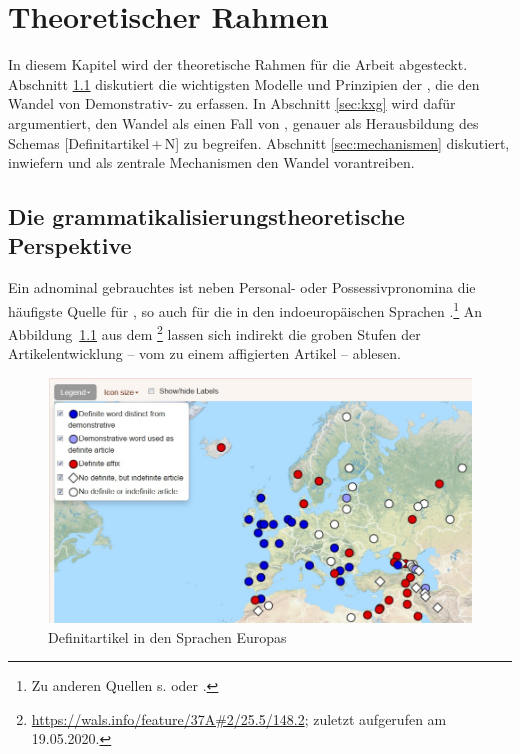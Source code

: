 \chapter{Theoretischer Rahmen} \label{chapter:theorie}

In diesem Kapitel wird der theoretische Rahmen für die Arbeit abgesteckt. 
Abschnitt \ref{sec:gram} diskutiert die wichtigsten Modelle und Prinzipien  der , die den Wandel von Demonstrativ- zu   erfassen. In Abschnitt \ref{sec:kxg} wird dafür argumentiert, den Wandel als einen Fall von , genauer als Herausbildung des Schemas [Definitartikel\,+\,N] zu begreifen. Abschnitt \ref{sec:mechanismen} diskutiert, inwiefern  und  als zentrale Mechanismen den Wandel vorantreiben.   

\section{Die grammatikalisierungstheoretische Perspektive}\label{sec:gram}

Ein adnominal gebrauchtes  ist neben Personal-  oder Possessivpronomina   die häufigste Quelle für  \parencites()(){Himmelmann1997}[215]{Heine2002}, so auch für die  in den indoeuropäischen Sprachen \parencite{vonHeusinger2013}.\footnote{Zu anderen Quellen s. \textcite[839]{Himmelmann2001} oder \textcite[523]{deMulder2011}.}
An Abbildung~\ref{wals} aus dem \footnote{\url{https://wals.info/feature/37A\#2/25.5/148.2}; zuletzt aufgerufen am 19.05.2020.} lassen sich indirekt die groben Stufen der Artikelentwicklung -- vom  zu einem affigierten Artikel  -- ablesen. 

\begin{figure}
\begin{center}
  \includegraphics[width=\textwidth]{images/wals.jpg}
\caption {Definitartikel in den Sprachen Europas \parencite{Dryer2013}}
\label{wals}
\end{center}
\end{figure} 


